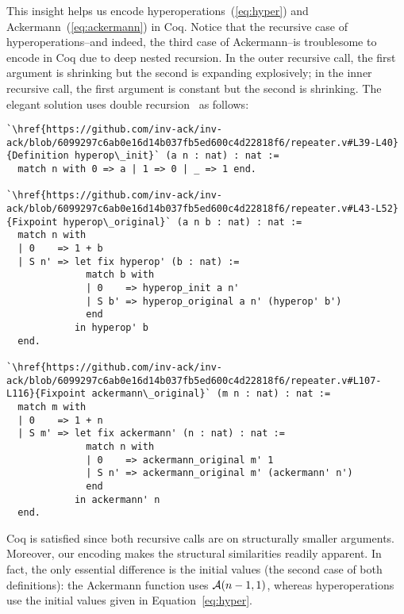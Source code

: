 This insight helps us encode hyperoperations~(\ref{eq:hyper}) and 
Ackermann~(\ref{eq:ackermann}) in Coq.  Notice that the recursive case of hyperoperations--and
indeed, the third case of Ackermann--is troublesome to encode in Coq due to
deep nested recursion.  In the outer recursive call, the first argument is shrinking
but the second is expanding explosively; in the inner recursive call, the first argument is
constant but the second is shrinking. The elegant solution uses double recursion~\cite{bertotcast} as follows:
\begin{lstlisting}
`\href{https://github.com/inv-ack/inv-ack/blob/6099297c6ab0e16d14b037fb5ed600c4d22818f6/repeater.v#L39-L40}{Definition hyperop\_init}` (a n : nat) : nat :=
  match n with 0 => a | 1 => 0 | _ => 1 end.

`\href{https://github.com/inv-ack/inv-ack/blob/6099297c6ab0e16d14b037fb5ed600c4d22818f6/repeater.v#L43-L52}{Fixpoint hyperop\_original}` (a n b : nat) : nat :=
  match n with
  | 0    => 1 + b
  | S n' => let fix hyperop' (b : nat) :=
              match b with
              | 0    => hyperop_init a n'
              | S b' => hyperop_original a n' (hyperop' b')
              end
            in hyperop' b
  end.

`\href{https://github.com/inv-ack/inv-ack/blob/6099297c6ab0e16d14b037fb5ed600c4d22818f6/repeater.v#L107-L116}{Fixpoint ackermann\_original}` (m n : nat) : nat :=
  match m with
  | 0    => 1 + n
  | S m' => let fix ackermann' (n : nat) : nat :=
              match n with
              | 0    => ackermann_original m' 1
              | S n' => ackermann_original m' (ackermann' n')
              end
            in ackermann' n
  end.
\end{lstlisting}
Coq is satisfied since both recursive calls are on structurally smaller arguments.
Moreover, our encoding makes the structural similarities
 readily apparent.  In fact, the only essential difference is the initial values
(the second case of both definitions): the Ackermann function uses $\mathcal{A}(n-1,1)$, whereas
hyperoperations use the initial values given in Equation~\ref{eq:hyper}.

